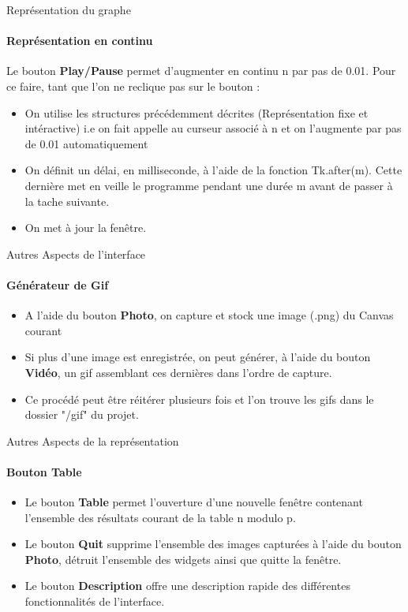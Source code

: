 \documentclass{beamer}
\begin{document}
\begin{frame}{Représentation du graphe}
\framesubtitle{Représentation en continu}
Le bouton \textbf{Play/Pause} permet d'augmenter en continu n par pas de 0.01. Pour ce faire, tant que l'on ne reclique pas sur le bouton :  
\begin{itemize}
\item On utilise les structures précédemment décrites (Représentation fixe et intéractive) i.e on fait appelle au curseur associé à n et on l'augmente par pas de 0.01 automatiquement
\item On définit un délai, en milliseconde, à l'aide de la fonction Tk.after(m). Cette dernière met en veille le programme  pendant une durée m avant de passer à la tache suivante.
\item On met à jour la fenêtre.
\end{itemize} 
\end{frame}

\begin{frame}{Autres Aspects de l'interface}
\framesubtitle{Générateur de Gif}
\begin{itemize}
\item A l'aide du bouton \textbf{Photo}, on capture et stock une image (.png) du Canvas courant
\item Si plus d'une image est enregistrée, on peut générer, à l'aide du bouton \textbf{Vidéo}, un gif assemblant ces dernières dans l'ordre de capture.
\item Ce procédé peut être réitérer plusieurs fois et l'on trouve les gifs dans le dossier "/gif" du projet.
\end{itemize} 
\end{frame}

\begin{frame}{Autres Aspects de la représentation}
\framesubtitle{Bouton Table}
\begin{itemize}
\item Le bouton \textbf{Table} permet l'ouverture d'une nouvelle fenêtre contenant l'ensemble des résultats courant de la table n modulo p.
\item Le bouton \textbf{Quit} supprime l'ensemble des images capturées à l'aide du bouton \textbf{Photo}, détruit l'ensemble des widgets ainsi que quitte la fenêtre.
\item Le bouton \textbf{Description} offre une description rapide des différentes fonctionnalités de l'interface.
\end{itemize}

\end{frame}
\end{document}
